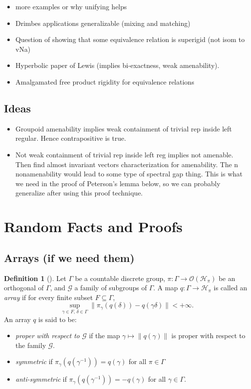 \documentclass[a4paper,11pt]{article}
\numberwithin{equation}{section}
\theoremstyle{definition}
\newtheorem{defn}[thm]{Definition}
\theoremstyle{remark}
\numberwithin{equation}{section}
\newcommand{\rG}{\mathcal{G}}
\def\H{\mathcal H}
\def\sub{\subseteq}
\newcommand{\mc}[1]{\mathcal{#1}}
\providecommand{\norm}[1]{\lVert#1\rVert}
\numberwithin{equation}{section}
\begin{document}
\begin{itemize}
  \item more examples or why unifying helps
  \item Drimbes applications generalizable (mixing and matching)
  \item Question of showing that some equivalence relation is superigid (not isom to vNa)
  \item Hyperbolic paper of Lewis (implies bi-exactness, weak amenability).
  \item Amalgamated free product rigidity for equivalence relations
\end{itemize}

\subsection{Ideas}
\begin{itemize}
  \item Groupoid amenability implies weak containment of trivial rep inside left regular. Hence contrapositive is true.
  \item Not weak containment of trivial rep inside left reg implies not amenable. Then find almost invariant vectors characterization for amenability. The n nonamenability would lead to some type of spectral gap thing. This is what we need in the proof of Peterson's lemma below, so we can probably generalize after using this proof technique.
\end{itemize}

\section{Random Facts and Proofs}





\subsection{Arrays (if we need them)}

\begin{defn}[\textcite{chifan:13}]
  Let $ \Gamma $ be a countable discrete group, $ \pi: \Gamma\to \mathcal{O}(\H_{\pi}) $ be an orthogonal of $ \Gamma $, and $ \mc{G} $ a family of subgroups of $ \Gamma $. A map $ q: \Gamma\to \H_{\pi} $ is called an \textit{array} if for every finite subset $ F\sub \Gamma $, 
  \[
    \sup_{\gamma\in F,\, \delta\in \Gamma} \norm{\pi_{\gamma}(q(\delta))-q(\gamma \delta)} < + \infty.
  \]
  An array $ q $ is said to be:
  \begin{itemize}
    \item \textit{proper with respect to $ \rG $} if the map $ \gamma\mapsto \norm{q(\gamma)} $ is proper with respect to the family $ \rG $. 
    \item \textit{symmetric} if $ \pi_{\gamma}(q(\gamma^{-1})) = q(\gamma) $ for all $ \pi\in \Gamma $
    \item \textit{anti-symmetric} if $ \pi_{\gamma}(q( \gamma^{-1})) = -q(\gamma) $ for all $ \gamma\in \Gamma $.
  \end{itemize}
   
\end{defn}
\end{document}
